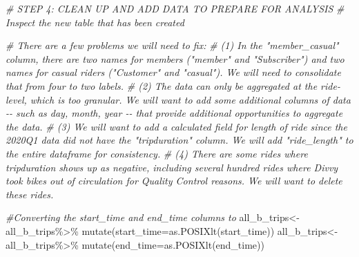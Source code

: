 \documentclass[
]{article}
\newenvironment{Shaded}{\begin{snugshade}}{\end{snugshade}}
\newcommand{\AttributeTok}[1]{\textcolor[rgb]{0.77,0.63,0.00}{#1}}
\newcommand{\CommentTok}[1]{\textcolor[rgb]{0.56,0.35,0.01}{\textit{#1}}}
\newcommand{\FunctionTok}[1]{\textcolor[rgb]{0.00,0.00,0.00}{#1}}
\newcommand{\NormalTok}[1]{#1}
\newcommand{\OtherTok}[1]{\textcolor[rgb]{0.56,0.35,0.01}{#1}}
\newcommand{\SpecialCharTok}[1]{\textcolor[rgb]{0.00,0.00,0.00}{#1}}
\begin{document}
\begin{Shaded}
\begin{Highlighting}[]
\CommentTok{\# STEP 4: CLEAN UP AND ADD DATA TO PREPARE FOR ANALYSIS}
\CommentTok{\# Inspect the new table that has been created}

\CommentTok{\# There are a few problems we will need to fix:}
\CommentTok{\# (1) In the "member\_casual" column, there are two names for members ("member" and "Subscriber") and two names for casual riders ("Customer" and "casual"). We will need to consolidate that from four to two labels.}
\CommentTok{\# (2) The data can only be aggregated at the ride{-}level, which is too granular. We will want to add some additional columns of data {-}{-} such as day, month, year {-}{-} that provide additional opportunities to aggregate the data.}
\CommentTok{\# (3) We will want to add a calculated field for length of ride since the 2020Q1 data did not have the "tripduration" column. We will add "ride\_length" to the entire dataframe for consistency.}
\CommentTok{\# (4) There are some rides where tripduration shows up as negative, including several hundred rides where Divvy took bikes out of circulation for Quality Control reasons. We will want to delete these rides.}

\CommentTok{\#Converting the start\_time and end\_time columns to}
\NormalTok{all\_b\_trips}\OtherTok{\textless{}{-}}\NormalTok{ all\_b\_trips}\SpecialCharTok{\%\textgreater{}\%}
              \FunctionTok{mutate}\NormalTok{(}\AttributeTok{start\_time=}\FunctionTok{as.POSIXlt}\NormalTok{(start\_time))}
\NormalTok{all\_b\_trips}\OtherTok{\textless{}{-}}\NormalTok{ all\_b\_trips}\SpecialCharTok{\%\textgreater{}\%}
              \FunctionTok{mutate}\NormalTok{(}\AttributeTok{end\_time=}\FunctionTok{as.POSIXlt}\NormalTok{(end\_time))}


\end{Highlighting}
\end{Shaded}
\end{document}
